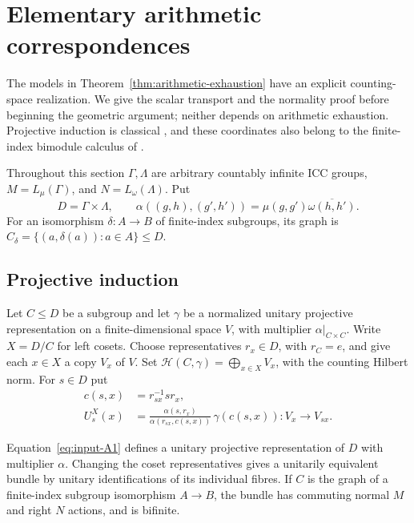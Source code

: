 \section{Elementary arithmetic correspondences}\label{sec:models}
The models in Theorem~\ref{thm:arithmetic-exhaustion} have an explicit
counting-space realization. We give the scalar transport and the
normality proof before beginning the geometric argument; neither depends
on arithmetic exhaustion. Projective induction is classical
\cite[Section~4]{Mackey1958}, and these coordinates also belong to the
finite-index bimodule calculus of \cite[Section~6.2]{Vaes2008}.

Throughout this section $\Gamma,\Lambda$ are arbitrary countably infinite
ICC groups, $M=L_\mu(\Gamma)$, and $N=L_\omega(\Lambda)$. Put
\[
 D=\Gamma\times\Lambda,\qquad
 \alpha((g,h),(g',h'))=\mu(g,g')\overline{\omega(h,h')}.
\]
For an isomorphism $\delta:A\to B$ of finite-index subgroups, its graph is
$C_\delta=\{(a,\delta(a)):a\in A\}\leq D$.

\subsection{Projective induction}
Let $C\leq D$ be a subgroup and let $\gamma$ be a normalized unitary
projective representation on a finite-dimensional space $V$, with
multiplier $\alpha|_{C\times C}$.  Write $X=D/C$ for left cosets.
Choose representatives $r_x\in D$, with $r_C=e$, and give each $x\in X$
a copy $V_x$ of $V$.  Set
$\mathcal H(C,\gamma)=\bigoplus_{x\in X}V_x$, with the counting
Hilbert norm.  For $s\in D$ put
\begin{equation}\label{eq:input-A1}
 \begin{split}
 c(s,x)&=r_{sx}^{-1}sr_x,\\
 U^X_s(x)&=
 \frac{\alpha(s,r_x)}{\alpha(r_{sx},c(s,x))}\,
 \gamma(c(s,x)):V_x\longrightarrow V_{sx}.
 \end{split}
\end{equation}

\begin{lemma}
\label{lem:models-induction}
Equation~\eqref{eq:input-A1} defines a unitary projective representation
of $D$ with multiplier $\alpha$.  Changing the coset representatives
gives a unitarily equivalent bundle by unitary identifications of its
individual fibres.  If $C$ is the graph of a finite-index subgroup
isomorphism $A\to B$, the bundle has commuting normal $M$ and right
$N$ actions, and is bifinite.
\end{lemma}


